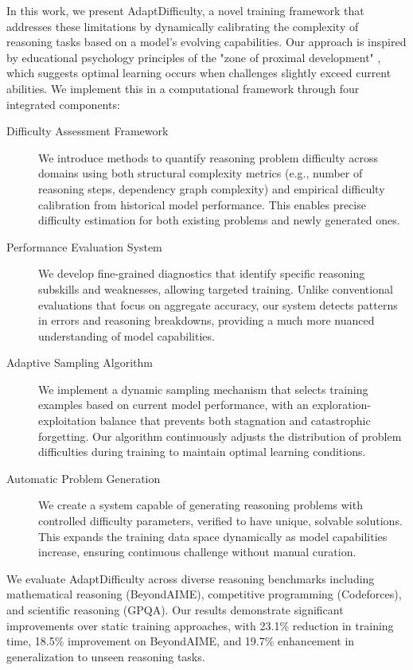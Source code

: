 In this work, we present AdaptDifficulty, a novel training framework that addresses these limitations by dynamically calibrating the complexity of reasoning tasks based on a model's evolving capabilities. Our approach is inspired by educational psychology principles of the "zone of proximal development" \cite{vygotsky1978mind}, which suggests optimal learning occurs when challenges slightly exceed current abilities. We implement this in a computational framework through four integrated components:

\begin{description}
\item[Difficulty Assessment Framework] We introduce methods to quantify reasoning problem difficulty across domains using both structural complexity metrics (e.g., number of reasoning steps, dependency graph complexity) and empirical difficulty calibration from historical model performance. This enables precise difficulty estimation for both existing problems and newly generated ones.

\item[Performance Evaluation System] We develop fine-grained diagnostics that identify specific reasoning subskills and weaknesses, allowing targeted training. Unlike conventional evaluations that focus on aggregate accuracy, our system detects patterns in errors and reasoning breakdowns, providing a much more nuanced understanding of model capabilities.

\item[Adaptive Sampling Algorithm] We implement a dynamic sampling mechanism that selects training examples based on current model performance, with an exploration-exploitation balance that prevents both stagnation and catastrophic forgetting. Our algorithm continuously adjusts the distribution of problem difficulties during training to maintain optimal learning conditions.

\item[Automatic Problem Generation] We create a system capable of generating reasoning problems with controlled difficulty parameters, verified to have unique, solvable solutions. This expands the training data space dynamically as model capabilities increase, ensuring continuous challenge without manual curation.
\end{description}

We evaluate AdaptDifficulty across diverse reasoning benchmarks including mathematical reasoning (BeyondAIME), competitive programming (Codeforces), and scientific reasoning (GPQA). Our results demonstrate significant improvements over static training approaches, with 23.1\% reduction in training time, 18.5\% improvement on BeyondAIME, and 19.7\% enhancement in generalization to unseen reasoning tasks.

